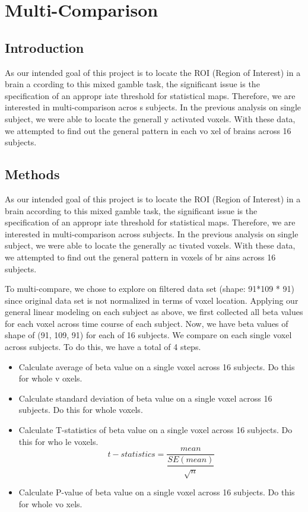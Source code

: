 \section{Multi-Comparison}

\subsection{Introduction}
As our intended goal of this project is to locate the ROI (Region of Interest) in a brain a
ccording to this mixed gamble task, the significant issue is the specification of an appropr
iate threshold for statistical maps. Therefore, we are interested in multi-comparison acros
s subjects. In the previous analysis on single subject, we were able to locate the generall
y activated voxels. With these data, we attempted to find out the general pattern in each vo
xel of brains across 16 subjects. 

\subsection{Methods}
As our intended goal of this project is to locate the ROI (Region of Interest) in a brain 
according to this mixed gamble task, the significant issue is the specification of an appropr
iate threshold for statistical maps. Therefore, we are interested in multi-comparison across 
subjects. In the previous analysis on single subject, we were able to locate the generally ac
tivated voxels. With these data, we attempted to find out the general pattern in voxels of br
ains across 16 subjects. 

To multi-compare, we chose to explore on filtered data set (shape: 91*109 * 91) since original
data set is not normalized in terms of voxel location. Applying our general linear modeling on
each subject as above, we first collected all beta values for each voxel across time course
of each subject. Now, we have beta values of shape of (91, 109, 91) for each of 16 subjects.
We compare on each single voxel across subjects. To do this, we have a total of 4 steps.

\begin{itemize}
\item Calculate average of beta value on a single voxel across 16 subjects. Do this for whole v
oxels.
\item Calculate standard deviation of beta value on a single voxel across 16 subjects. Do this 
for whole voxels. 
\item Calculate T-statistics of beta value on a single voxel across 16 subjects. Do this for who
le voxels.
\[ 
  t-statistics = \dfrac{mean}{\dfrac{SE(mean)}{\sqrt{n}}}
\]

\item Calculate P-value of beta value on a single voxel across 16 subjects. Do this for whole vo
xels. 
\end{itemize}

